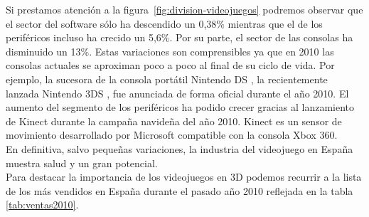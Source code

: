 Si prestamos atención a la figura~\ref{fig:division-videojuegos} podremos
observar que el sector del software sólo ha descendido un 0,38\% mientras
que el de los periféricos incluso ha crecido un 5,6\%. Por su parte, el sector de
las consolas ha disminuido un 13\%. Estas variaciones son comprensibles
ya que en 2010 las consolas actuales se aproximan poco a poco al final de
su ciclo de vida. Por ejemplo, la sucesora de la consola portátil Nintendo DS
\cite{website:nintendo-ds}, la recientemente lanzada Nintendo 3DS \cite{website:nintendo-3ds},
fue anunciada de forma oficial durante el año 2010. El aumento del segmento
de los periféricos ha podido crecer gracias al lanzamiento de Kinect \cite{website:kinect}
durante la campaña navideña del año 2010. Kinect es un sensor de movimiento
desarrollado por Microsoft compatible con la consola Xbox 360.\\

En definitiva, salvo pequeñas variaciones, la industria del videojuego
en España muestra salud y un gran potencial.\\

Para destacar la importancia de los videojuegos en 3D podemos recurrir
a la lista de los más vendidos en España durante el pasado año 2010 reflejada
en la tabla \ref{tab:ventas2010}.\\

